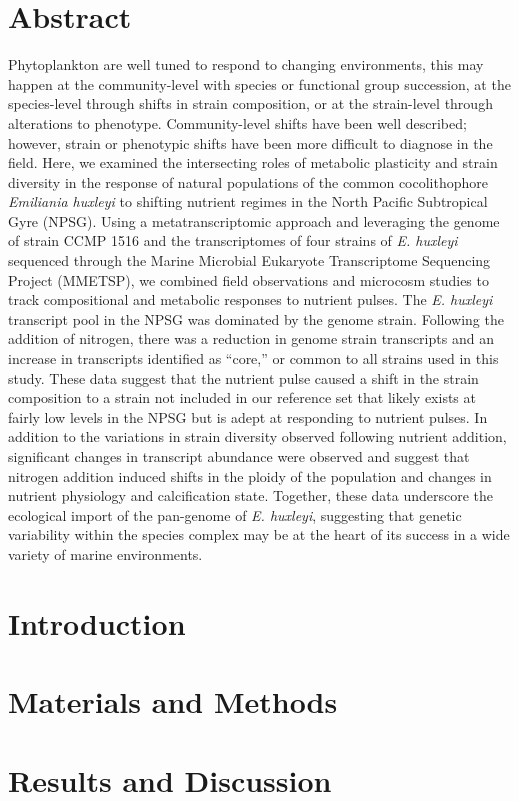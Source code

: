 \section{Abstract}
Phytoplankton are well tuned to respond to changing environments, this may happen at the community-level with species or functional group succession, at the species-level through shifts in strain composition, or at the strain-level through alterations to phenotype. Community-level shifts have been well described; however, strain or phenotypic shifts have been more difficult to diagnose in the field. Here, we examined the intersecting roles of metabolic plasticity and strain diversity in the response of natural populations of the common cocolithophore \textit{Emiliania huxleyi} to shifting nutrient regimes in the North Pacific Subtropical Gyre (NPSG). Using a metatranscriptomic approach and leveraging the genome of strain CCMP 1516 and the transcriptomes of four strains of \textit{E. huxleyi} sequenced through the Marine Microbial Eukaryote Transcriptome Sequencing Project (MMETSP), we combined field observations and microcosm studies to track compositional and metabolic responses to nutrient pulses. The \textit{E. huxleyi} transcript pool in the NPSG was dominated by the genome strain. Following the addition of nitrogen, there was a reduction in genome strain transcripts and an increase in transcripts identified as “core,” or common to all strains used in this study. These data suggest that the nutrient pulse caused a shift in the strain composition to a strain not included in our reference set that likely exists at fairly low levels in the NPSG but is adept at responding to nutrient pulses. In addition to the variations in strain diversity observed following nutrient addition, significant changes in transcript abundance were observed and suggest that nitrogen addition induced shifts in the ploidy of the population and changes in nutrient physiology and calcification state. Together, these data underscore the ecological import of the pan-genome of \textit{E. huxleyi}, suggesting that genetic variability within the species complex may be at the heart of its success in a wide variety of marine environments.  
\section{Introduction}

\section{Materials and Methods}
\section{Results and Discussion}
